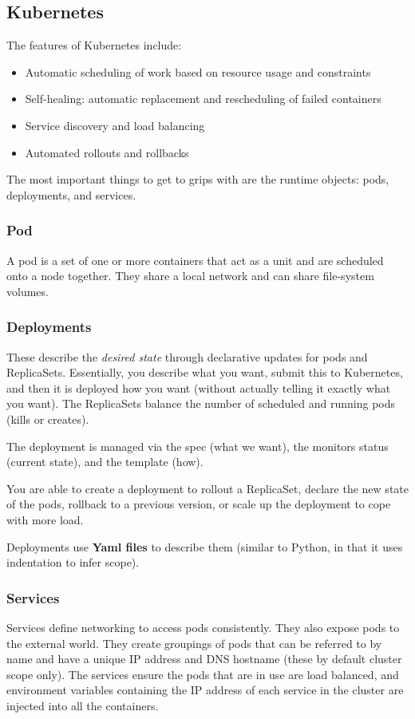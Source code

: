 \documentclass[11pt,a4paper,titlepage,dvipsnames,cmyk]{scrartcl}
\begin{document}
\subsection{Kubernetes}
The features of Kubernetes include:
\begin{itemize}
    \item Automatic scheduling of work based on resource usage and constraints
    \item Self-healing: automatic replacement and rescheduling of failed containers
    \item Service discovery and load balancing
    \item Automated rollouts and rollbacks
\end{itemize}

The most important things to get to grips with are the runtime objects: pods, deployments, and services.

\subsubsection{Pod}
A pod is a set of one or more containers that act as a unit and are scheduled onto a node together. They share a local network and can share file-system volumes.

\subsubsection{Deployments}
These describe the \textit{desired state} through declarative updates for pods and ReplicaSets. Essentially, you describe what you want, submit this to Kubernetes, and then it is deployed how you want (without actually telling it exactly what you want). The ReplicaSets balance the number of scheduled and running pods (kills or creates).

The deployment is managed via the spec (what we want), the monitors status (current state), and the template (how).

You are able to create a deployment to rollout a ReplicaSet, declare the new state of the pods, rollback to a previous version, or scale up the deployment to cope with more load.

Deployments use \textbf{Yaml files} to describe them (similar to Python, in that it uses indentation to infer scope).

\subsubsection{Services}
Services define networking to access pods consistently. They also expose pods to the external world. They create groupings of pods that can be referred to by name and have a unique IP address and DNS hostname (these by default cluster scope only). The services ensure the pods that are in use are load balanced, and environment variables containing the IP address of each service in the cluster are injected into all the containers.
\end{document}
